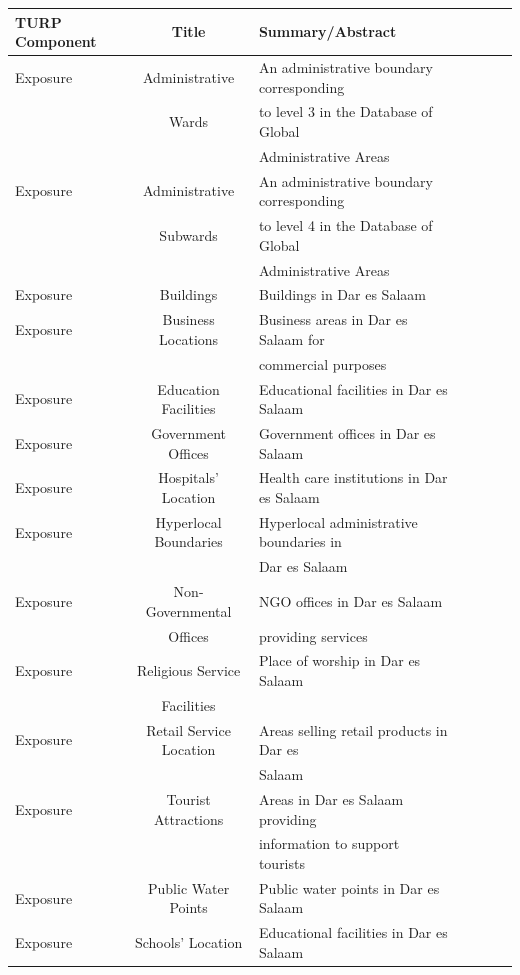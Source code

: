 \documentclass[a4paper,12pt,twoside]{article}
\begin{document}
\begin{tabular}{|l|c|l|c|l|c|l|}
\hline
\bfseries TURP Component & \bfseries Title & \bfseries Summary/Abstract\\
\hline
Exposure & Administrative & An administrative boundary corresponding\\
{} & Wards &  to level 3 in the Database of Global\\
{} & {} &  Administrative Areas\\
\hline
Exposure & Administrative  & An administrative boundary corresponding \\
{} & Subwards & to level 4 in the Database of Global\\
{} & {} & Administrative Areas\\
\hline
Exposure & Buildings & Buildings in Dar es Salaam\\
\hline
Exposure & Business Locations & Business areas in Dar es Salaam for \\
{} & {} & commercial purposes\\
\hline
Exposure & Education Facilities & Educational facilities in Dar es Salaam\\
\hline
Exposure & Government Offices & Government offices in Dar es Salaam\\
\hline
Exposure & Hospitals' Location & 
 Health care institutions in Dar es Salaam\\
\hline
Exposure & Hyperlocal Boundaries & Hyperlocal administrative boundaries in \\
{} & {} & Dar es Salaam\\
\hline
Exposure & Non-Governmental & NGO offices in Dar es Salaam \\
{} & Offices & providing services\\
\hline
Exposure & Religious Service  & Place of worship in Dar es Salaam\\
{} & Facilities & {}\\
\hline
Exposure & Retail Service Location & Areas selling retail products in Dar es \\
{} & {} & Salaam\\
\hline
Exposure & Tourist Attractions & Areas in Dar es Salaam providing\\
 {} & {} & information to support tourists\\
\hline
Exposure & Public Water Points & Public water points in Dar es Salaam\\
\hline 
Exposure & Schools’ Location & Educational facilities in Dar es Salaam\\

\end{tabular}
\end{document}
